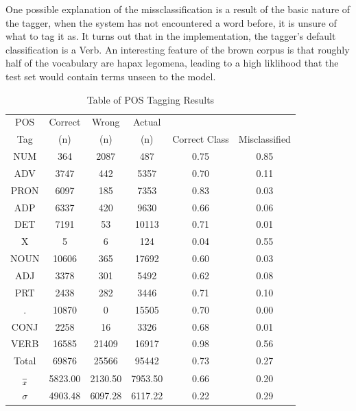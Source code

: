 \documentclass[10pt]{report}
\begin{document}
One possible explanation of the missclassification is a result of the basic nature of the tagger, when the system has not encountered a word before, it is unsure of what to tag it as. It turns out that in the implementation, the tagger's default classification is a Verb. An interesting feature of the brown corpus is that roughly half of the vocabulary are hapax legomena, leading to a high liklihood that the test set would contain terms unseen to the model. 

\renewcommand{\baselinestretch}{1.0}\normalsize
\renewcommand{\arraystretch}{1.2}
\begin{table}[h!]
  \centering
  \begin{tabular}{c | c | c | c || c | c }
  POS &	Correct &	Wrong &	Actual&	&\\
  Tag & (n)&(n)&(n)& Correct Class&Misclassified  
  \\\hline
    NUM    &364   &	2087&	487&	0.75&	0.85
    \\ADV  &3747  &	442&	5357&	0.70&	0.11
    \\PRON &6097  &	185&	7353&	0.83&	0.03
    \\ADP  &6337  &	420&	9630&	0.66&	0.06
    \\DET  &7191  &	53&	10113&	0.71&	0.01
    \\X    &5     &	6&	124&	0.04&	0.55
    \\NOUN &10606 &	365&	17692&	0.60&	0.03
    \\ADJ  &3378  &	301&	5492&	0.62&	0.08
    \\PRT  &2438  &	282&	3446&	0.71&	0.10
    \\.    &10870 &	0&	15505&	0.70&	0.00
    \\CONJ &2258  &	16&	3326&	0.68&	0.01
    \\VERB &16585 &	21409&	16917&	0.98&	0.56
  \\\hline\hline
    Total &69876 &	25566   &95442&	0.73&	0.27
  \\$\over{x}$	 &      5823.00	&2130.50	&7953.50	&0.66	&0.20
  \\$\sigma$	 &      4903.48	&6097.28	&6117.22	&0.22	&0.29
\end{tabular}
\caption{ Table of POS Tagging Results\label{tab:pos_results}}
\end{table}
\renewcommand{\baselinestretch}{2.0}\normalsize
\renewcommand{\arraystretch}{1.0}
\end{document}
